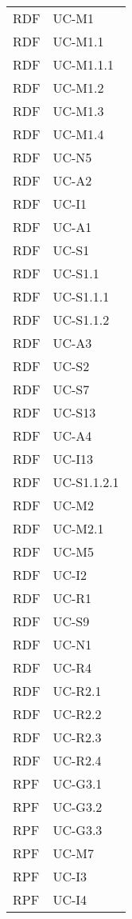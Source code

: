\begin{longtable}{| p{5cm} | p{5cm} |}
		RDF & UC-M1\\
		RDF & UC-M1.1 \\
		RDF & UC-M1.1.1 \\
		RDF & UC-M1.2 \\
		RDF & UC-M1.3 \\
		RDF & UC-M1.4 \\
		\rowcolor{LightGray}
		RDF & UC-N5\\
		RDF & UC-A2\\
		\rowcolor{LightGray}
		RDF & UC-I1\\
		RDF & UC-A1\\
		\rowcolor{LightGray}
		RDF & UC-S1\\
		RDF & UC-S1.1\\
		\rowcolor{LightGray}
		RDF & UC-S1.1.1\\
		RDF & UC-S1.1.2\\
		\rowcolor{LightGray}
		RDF & UC-A3\\
		RDF & UC-S2\\
		\rowcolor{LightGray}
		RDF & UC-S7\\
		RDF & UC-S13\\
		\rowcolor{LightGray}
		RDF & UC-A4\\
		RDF & UC-I13 \\
		\rowcolor{LightGray}
		RDF & UC-S1.1.2.1 \\
		RDF & UC-M2 \\
		RDF & UC-M2.1 \\
		\rowcolor{LightGray}
		RDF & UC-M5 \\
		RDF & UC-I2 \\
		\rowcolor{LightGray}
		RDF & UC-R1 \\
		RDF & UC-S9 \\
		\rowcolor{LightGray}
		RDF & UC-N1\\
		RDF & UC-R4\\
		\rowcolor{LightGray}
		RDF & UC-R2.1\\
		RDF & UC-R2.2\\
		\rowcolor{LightGray}
		RDF & UC-R2.3\\
		RDF & UC-R2.4\\
		\rowcolor{LightGray}
		RPF & UC-G3.1\\
		\rowcolor{LightGray}
		RPF & UC-G3.2\\
		RPF & UC-G3.3\\
		\rowcolor{LightGray}
		RPF & UC-M7\\
		RPF & UC-I3\\
		\rowcolor{LightGray}
		RPF & UC-I4\\

\end{longtable}
